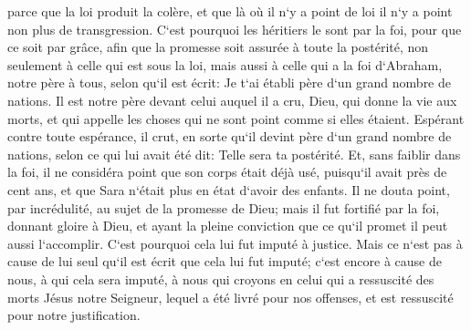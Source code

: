 \verse parce que la loi produit la colère, et que là où il n`y a point de loi il n`y a point non plus de transgression. 
\verse C`est pourquoi les héritiers le sont par la foi, pour que ce soit par grâce, afin que la promesse soit assurée à toute la postérité, non seulement à celle qui est sous la loi, mais aussi à celle qui a la foi d`Abraham, notre père à tous, selon qu`il est écrit: 
\verse Je t`ai établi père d`un grand nombre de nations. Il est notre père devant celui auquel il a cru, Dieu, qui donne la vie aux morts, et qui appelle les choses qui ne sont point comme si elles étaient. 
\verse Espérant contre toute espérance, il crut, en sorte qu`il devint père d`un grand nombre de nations, selon ce qui lui avait été dit: Telle sera ta postérité. 
\verse Et, sans faiblir dans la foi, il ne considéra point que son corps était déjà usé, puisqu`il avait près de cent ans, et que Sara n`était plus en état d`avoir des enfants. 
\verse Il ne douta point, par incrédulité, au sujet de la promesse de Dieu; mais il fut fortifié par la foi, donnant gloire à Dieu, 
\verse et ayant la pleine conviction que ce qu`il promet il peut aussi l`accomplir. 
\verse C`est pourquoi cela lui fut imputé à justice. 
\verse Mais ce n`est pas à cause de lui seul qu`il est écrit que cela lui fut imputé; 
\verse c`est encore à cause de nous, à qui cela sera imputé, à nous qui croyons en celui qui a ressuscité des morts Jésus notre Seigneur, 
\verse lequel a été livré pour nos offenses, et est ressuscité pour notre justification. 


